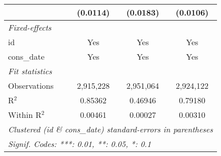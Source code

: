 \begin{tabular}{lccc}
                                                             & (0.0114)        & (0.0183)       & (0.0106)\\
   \midrule \emph{Fixed-effects} &   &   &  \\
   id                                                        & Yes             & Yes            & Yes\\
   cons\_date                                               & Yes             & Yes            & Yes\\
   \midrule \emph{Fit statistics} &   &   &  \\
   Observations                                              & 2,915,228       & 2,951,064      & 2,924,122\\
   R$^2$                                                     & 0.85362         & 0.46946        & 0.79180\\
   Within R$^2$                                              & 0.00461         & 0.00027        & 0.00310\\
   \midrule\midrule\multicolumn{4}{l}{\emph{Clustered (id \& cons\_date) standard-errors in parentheses}}\\
   \multicolumn{4}{l}{\emph{Signif. Codes: ***: 0.01, **: 0.05, *: 0.1}}\\
\end{tabular}


